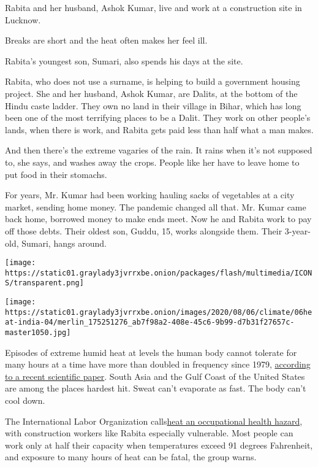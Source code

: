 Rabita and her husband, Ashok Kumar, live and work at a construction
site in Lucknow.

Breaks are short and the heat often makes her feel ill.

Rabita's youngest son, Sumari, also spends his days at the site.

Rabita, who does not use a surname, is helping to build a government
housing project. She and her husband, Ashok Kumar, are Dalits, at the
bottom of the Hindu caste ladder. They own no land in their village in
Bihar, which has long been one of the most terrifying places to be a
Dalit. They work on other people's lands, when there is work, and Rabita
gets paid less than half what a man makes.

And then there's the extreme vagaries of the rain. It rains when it's
not supposed to, she says, and washes away the crops. People like her
have to leave home to put food in their stomachs.

For years, Mr. Kumar had been working hauling sacks of vegetables at a
city market, sending home money. The pandemic changed all that. Mr.
Kumar came back home, borrowed money to make ends meet. Now he and
Rabita work to pay off those debts. Their oldest son, Guddu, 15, works
alongside them. Their 3-year-old, Sumari, hangs around.

\texttt{[image: https://static01.graylady3jvrrxbe.onion/packages/flash/multimedia/ICONS/transparent.png]}

\texttt{[image: https://static01.graylady3jvrrxbe.onion/images/2020/08/06/climate/06heat-india-04/merlin\_175251276\_ab7f98a2-408e-45c6-9b99-d7b31f27657c-master1050.jpg]}

Episodes of extreme humid heat at levels the human body cannot tolerate
for many hours at a time have more than doubled in frequency since 1979,
\href{https://blogs.ei.columbia.edu/2020/05/08/fatal-heat-humidity-emerging/?shareadraft=baba77757_5e8c736da48a5}{according
to a recent scientific paper}. South Asia and the Gulf Coast of the
United States are among the places hardest hit. Sweat can't evaporate as
fast. The body can't cool down.

The International Labor Organization
calls\href{https://www.ilo.org/wcmsp5/groups/public/---dgreports/---dcomm/---publ/documents/publication/wcms_711919.pdf}{}\href{https://www.ilo.org/wcmsp5/groups/public/---dgreports/---dcomm/---publ/documents/publication/wcms_711919.pdf}{heat
an occupational health hazard}, with construction workers like Rabita
especially vulnerable. Most people can work only at half their capacity
when temperatures exceed 91 degrees Fahrenheit, and exposure to many
hours of heat can be fatal, the group warns.

